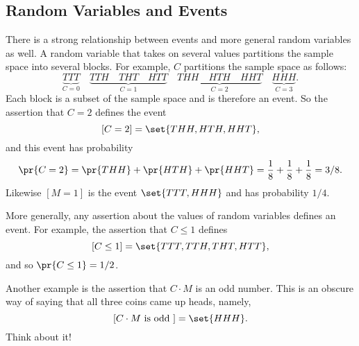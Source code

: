 \subsection{Random Variables and Events}

There is a strong relationship between events and more general random
variables as well.  A random variable that takes on several values
partitions the sample space into several blocks.  For example, $C$
partitions the sample space as follows:
\[
\underbrace{TTT}_{\text{$C = 0$}} \quad
\underbrace{TTH \quad THT \quad HTT}_{\text{$C = 1$}} \quad
\underbrace{THH \quad HTH \quad HHT}_{\text{$C = 2$}} \quad
\underbrace{HHH}_{\text{$C = 3$}}.
\]
Each block is a subset of the sample space and is therefore an event.
So the assertion that $C = 2$ defines the event
\[
[C = 2] = \set{THH, HTH, HHT},
\]
and this event has probability
\[
\pr{C = 2} = \pr{THH} + \pr{HTH} +\pr{HHT} = \frac{1}{8} + \frac{1}{8} +\frac{1}{8} =3/8.
\]
Likewise $[M = 1]$ is the event $\set{TTT, HHH}$ and has probability
$1/4$.

\iffalse
As another example:
\[
\pr{M = 1} =  \pr{TTT} + \pr{HHH} =  \frac{1}{8} + \frac{1}{8} =  \frac{1}{4}\,.
\]
\fi

More generally, any assertion about the values of random variables
defines an event.  For example, the assertion that $C \leq 1$ defines
\[
[C \leq 1] = \set{TTT, TTH, THT, HTT},
\]
and so $\pr{C \leq 1}= 1/2$.

Another example is the assertion that $C \cdot M$ is an odd number.
This is an obscure way of saying that all three coins came up heads,
namely,
\[
[C \cdot M \text{ is odd }] = \set{HHH}.
\]
Think about it!

\iffalse

Naturally enough, we can talk about the probability of events defined
by properties of random variables.  For example,
\[
\pr{C = 2}  =  \pr{THH} + \pr{HTH} + \pr{HHT}  =  \frac{1}{8} +
\frac{1}{8} + \frac{1}{8} =  \frac{3}{8}.
\]

\begin{eqnarray*}
\pr{C = 2}
        & = &   \pr{THH} + \pr{HTH} + \pr{HHT} \\
        & = &   \frac{1}{8} + \frac{1}{8} + \frac{1}{8} =  \frac{3}{8}\,.
\end{eqnarray*}

As another example:
\[
\pr{M = 1} =  \pr{TTT} + \pr{HHH} =  \frac{1}{8} + \frac{1}{8} =  \frac{1}{4}\,.
\]


\begin{eqnarray*}
\pr{M = 1}
        & = &   \pr{TTT} + \pr{HHH}\\
        & = &   \frac{1}{8} + \frac{1}{8} =  \frac{1}{4}.
\end{eqnarray*}
\fi

